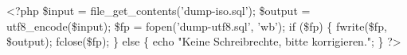 \begin{ospcode}
<?php
\$input  = file_get_contents('dump-iso.sql');
\$output = utf8_encode(\$input);
\$fp     = fopen('dump-utf8.sql', 'wb');
if (\$fp) \{
  fwrite(\$fp, \$output);
  fclose(\$fp);
\} else \{
  echo "Keine Schreibrechte, bitte korrigieren.";
\}
?>
\end{ospcode}